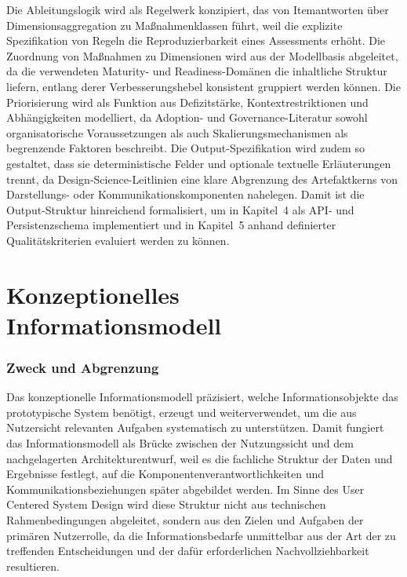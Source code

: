 Die Ableitungslogik wird als Regelwerk konzipiert, das von Itemantworten über Dimensionsaggregation zu Maßnahmenklassen führt, weil die explizite Spezifikation von Regeln die Reproduzierbarkeit eines Assessments erhöht.\cite{Hevner2004DesignScience,MarchSmith1995DesignNaturalScience}
Die Zuordnung von Maßnahmen zu Dimensionen wird aus der Modellbasis abgeleitet, da die verwendeten Maturity- und Readiness-Domänen die inhaltliche Struktur liefern, entlang derer Verbesserungshebel konsistent gruppiert werden können.\cite{Langer2025DataAnalyticsMaturityReview,daSilvaCostaMamedeSilva2022RPAAdoptionSLR}
Die Priorisierung wird als Funktion aus Defizitstärke, Kontextrestriktionen und Abhängigkeiten modelliert, da Adoption- und Governance-Literatur sowohl organisatorische Voraussetzungen als auch Skalierungsmechanismen als begrenzende Faktoren beschreibt.\cite{TornatzkyFleischer1990TOE,KedzioraPenttinen2021RPAGovernance,daSilvaCostaMamedeSilva2022RPAAdoptionSLR}
Die Output-Spezifikation wird zudem so gestaltet, dass sie deterministische Felder und optionale textuelle Erläuterungen trennt, da Design-Science-Leitlinien eine klare Abgrenzung des Artefaktkerns von Darstellungs- oder Kommunikationskomponenten nahelegen.\cite{Hevner2004DesignScience,MarchSmith1995DesignNaturalScience}
Damit ist die Output-Struktur hinreichend formalisiert, um in Kapitel~4 als API- und Persistenzschema implementiert und in Kapitel~5 anhand definierter Qualitätskriterien evaluiert werden zu können.\cite{Hevner2004DesignScience,Nunamaker1990SystemsDevelopment}


\section{Konzeptionelles Informationsmodell}\label{sec:konzeptionellesInformationsmodell}

\subsubsection{Zweck und Abgrenzung}
Das konzeptionelle Informationsmodell präzisiert, welche Informationsobjekte das prototypische System benötigt, erzeugt und weiterverwendet, um die aus Nutzersicht relevanten Aufgaben systematisch zu unterstützen. \cite{normanDraper1986,iso9241_210_2019}
Damit fungiert das Informationsmodell als Brücke zwischen der Nutzungssicht und dem nachgelagerten Architekturentwurf, weil es die fachliche Struktur der Daten und Ergebnisse festlegt, auf die Komponentenverantwortlichkeiten und Kommunikationsbeziehungen später abgebildet werden. \cite{iso9241_210_2019,nunamaker1990}
Im Sinne des User Centered System Design wird diese Struktur nicht aus technischen Rahmenbedingungen abgeleitet, sondern aus den Zielen und Aufgaben der primären Nutzerrolle, da die Informationsbedarfe unmittelbar aus der Art der zu treffenden Entscheidungen und der dafür erforderlichen Nachvollziehbarkeit resultieren. \cite{normanDraper1986,iso9241_210_2019}

